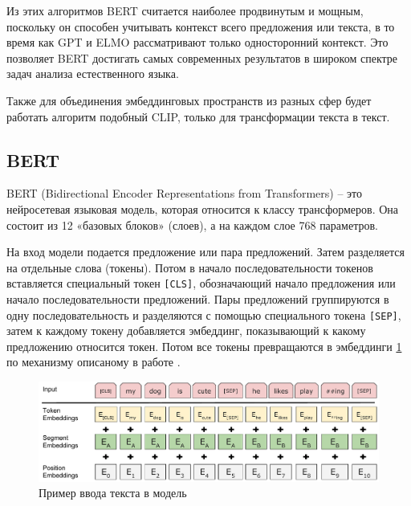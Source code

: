 \documentclass[PI, VKR]{HSEUniversity}
\begin{document}
Из этих алгоритмов BERT считается наиболее продвинутым и мощным, поскольку он способен учитывать контекст всего предложения или текста, в то время как GPT и ELMO рассматривают только односторонний контекст. Это позволяет BERT достигать самых современных результатов в широком спектре задач анализа естественного языка.

Также для объединения эмбеддинговых пространств из разных сфер будет работать алгоритм подобный CLIP\autocite{radford_learning_2021}, только для трансформации текста в текст.
\subsection{BERT}
\label{sec:org7c7adca}
BERT \autocite{devlin_bert_2019} (Bidirectional Encoder Representations from Transformers) -- это нейросетевая языковая модель, которая относится к классу трансформеров. Она состоит из 12 «базовых блоков» (слоев), а на каждом слое 768 параметров.

На вход модели подается предложение или пара предложений. Затем разделяется на отдельные слова (токены). Потом в начало последовательности токенов вставляется специальный токен \texttt{[CLS]}, обозначающий начало предложения или начало последовательности предложений. Пары предложений группируются в одну последовательность и разделяются с помощью специального токена \texttt{[SEP]}, затем к каждому токену добавляется эмбеддинг, показывающий к какому предложению относится токен. Потом все токены превращаются в эмбеддинги \ref{fig:inputemebeddings} по механизму описаному в работе \autocite{vaswani_attention_2017}.

\begin{figure}[h]
\centering
\includegraphics[width=.9\linewidth]{img/Input_Emebeddings.pdf}
\caption{\label{fig:inputemebeddings}Пример ввода текста в модель}
\end{figure}
\end{document}
